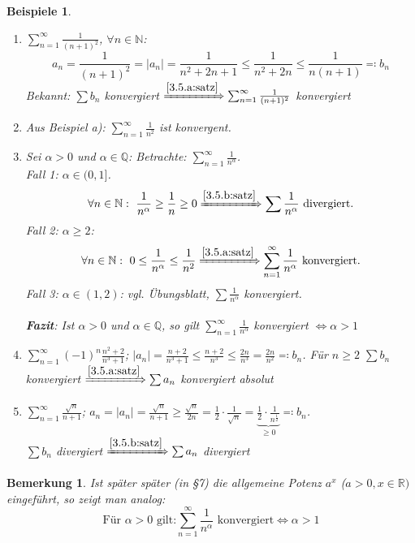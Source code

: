 \documentclass[14pt,titlepage,ngerman,a4paper,headsepline,DIV15,halfparskip*]{scrartcl}
\newcommand{\N}{\mathbb{N}}
\newcommand{\Q}{\mathbb{Q}}
\newcommand{\R}{\mathbb{R}}
\theoremstyle{named}
\theoremstyle{dotless}
\newtheorem*{beispiele}{Beispiele}
\newtheorem*{bemerkung}{Bemerkung}
\begin{document}
\begin{beispiele} ~\
	\begin{enumerate}
		\item $\sum_{n=1}^{\infty} \frac{1}{(n+1)^{2}}$, $\forall n \in \N$:
			$$ a_{n} = \frac{1}{(n+1)^{2}} = |a_{n}| = \frac{1}{n^{2} + 2n +1} \leq \frac{1}{n^{2} + 2n} \leq \frac{1}{n(n+1)} \eqqcolon b_{n} $$
			Bekannt: $\sum b_{n}$ konvergiert $\xRightarrow[]{\ref{3.5.a:satz}} \sum_{n=1}^{\infty} \frac{1}{(n+1)^{2}}$ konvergiert
		\item Aus Beispiel a): $\sum_{n=1}^{\infty} \frac{1}{n^{2}}$ ist konvergent.
		\item Sei $\alpha > 0$ und $\alpha \in \Q$: Betrachte: $\sum_{n=1}^{\infty} \frac{1}{n^{\alpha}}$. \\
			Fall 1: $\alpha \in (0, 1]$.
				$$ \forall n \in \N: ~ \frac{1}{n^{\alpha}} \geq \frac{1}{n} \geq 0 \xRightarrow[]{\ref{3.5.b:satz}} \sum \frac{1}{n^{\alpha}} \text{ divergiert.} $$
			Fall 2: $\alpha \geq 2$: \\
				$$ \forall n \in \N: ~ 0 \leq \frac{1}{n^{\alpha}} \leq \frac{1}{n^{2}} \xRightarrow[]{\ref{3.5.a:satz}} \sum_{n=1}^{\infty} \frac{1}{n^{\alpha}} \text{ konvergiert.} $$
			Fall 3: $\alpha \in (1, 2)$: vgl. Übungsblatt, $\sum \frac{1}{n^{\alpha}}$ konvergiert. \\ \\
			\textbf{Fazit}: Ist $\alpha > 0$ und $\alpha \in \Q$, so gilt $\sum_{n=1}^{\infty} \frac{1}{n^{\alpha}}$ konvergiert $\Leftrightarrow \alpha > 1$
		\item $\sum_{n=1}^{\infty} (-1)^{n} \frac{n^{2} + 2}{n^{3} + 1}$; $|a_{n}| = \frac{n+2}{n^{3} + 1} \leq \frac{n+2}{n^{3}} \leq \frac{2n}{n^{3}} = \frac{2n}{n^{2}} \eqqcolon b_{n}$. Für $n \geq 2$ $\sum b_{n}$ konvergiert $\xRightarrow[]{\ref{3.5.a:satz}} \sum a_{n}$ konvergiert absolut
		\item $\sum_{n=1}^{\infty} \frac{\sqrt{n}}{n+1}$; $a_{n} = |a_{n}| = \frac{\sqrt{n}}{n+1} \geq \frac{\sqrt{n}}{2n} = \frac{1}{2} \cdot \frac{1}{\sqrt{n}} = \underbrace{\frac{1}{2} \cdot \frac{1}{n^{\frac{1}{2}}}}_{\geq 0} \eqqcolon b_{n}$. \\
			$\sum b_{n}$ divergiert $\xRightarrow[]{\ref{3.5.b:satz}} \sum a_{n}$ divergiert
	\end{enumerate}		
\end{beispiele}


\begin{bemerkung}
	Ist später später (in \S 7) die allgemeine Potenz $a^{x}$ ($a > 0, x \in \R)$ eingeführt, so zeigt man analog:
	$$ \text{Für } \alpha > 0 \text{ gilt:} \sum_{n=1}^{\infty} \frac{1}{n^{\alpha}} \text{ konvergiert} \iff \alpha > 1 $$
\end{bemerkung}
\end{document}
